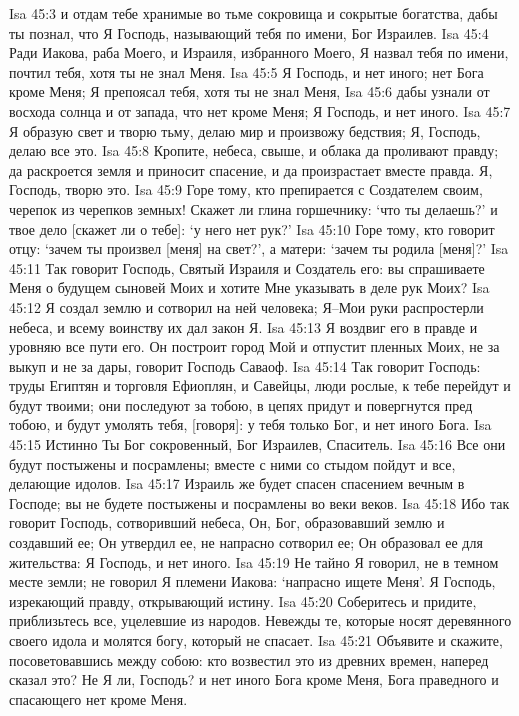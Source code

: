 Isa 45:3  и отдам тебе хранимые во тьме сокровища и сокрытые богатства, дабы ты познал, что Я Господь, называющий тебя по имени, Бог Израилев.
Isa 45:4  Ради Иакова, раба Моего, и Израиля, избранного Моего, Я назвал тебя по имени, почтил тебя, хотя ты не знал Меня.
Isa 45:5  Я Господь, и нет иного; нет Бога кроме Меня; Я препоясал тебя, хотя ты не знал Меня,
Isa 45:6  дабы узнали от восхода солнца и от запада, что нет кроме Меня; Я Господь, и нет иного.
Isa 45:7  Я образую свет и творю тьму, делаю мир и произвожу бедствия; Я, Господь, делаю все это.
Isa 45:8  Кропите, небеса, свыше, и облака да проливают правду; да раскроется земля и приносит спасение, и да произрастает вместе правда. Я, Господь, творю это.
Isa 45:9  Горе тому, кто препирается с Создателем своим, черепок из черепков земных! Скажет ли глина горшечнику: `что ты делаешь?' и твое дело [скажет ли о тебе]: `у него нет рук?'
Isa 45:10  Горе тому, кто говорит отцу: `зачем ты произвел [меня] на свет?', а матери: `зачем ты родила [меня]?'
Isa 45:11  Так говорит Господь, Святый Израиля и Создатель его: вы спрашиваете Меня о будущем сыновей Моих и хотите Мне указывать в деле рук Моих?
Isa 45:12  Я создал землю и сотворил на ней человека; Я--Мои руки распростерли небеса, и всему воинству их дал закон Я.
Isa 45:13  Я воздвиг его в правде и уровняю все пути его. Он построит город Мой и отпустит пленных Моих, не за выкуп и не за дары, говорит Господь Саваоф.
Isa 45:14  Так говорит Господь: труды Египтян и торговля Ефиоплян, и Савейцы, люди рослые, к тебе перейдут и будут твоими; они последуют за тобою, в цепях придут и повергнутся пред тобою, и будут умолять тебя, [говоря]: у тебя только Бог, и нет иного Бога.
Isa 45:15  Истинно Ты Бог сокровенный, Бог Израилев, Спаситель.
Isa 45:16  Все они будут постыжены и посрамлены; вместе с ними со стыдом пойдут и все, делающие идолов.
Isa 45:17  Израиль же будет спасен спасением вечным в Господе; вы не будете постыжены и посрамлены во веки веков.
Isa 45:18  Ибо так говорит Господь, сотворивший небеса, Он, Бог, образовавший землю и создавший ее; Он утвердил ее, не напрасно сотворил ее; Он образовал ее для жительства: Я Господь, и нет иного.
Isa 45:19  Не тайно Я говорил, не в темном месте земли; не говорил Я племени Иакова: `напрасно ищете Меня'. Я Господь, изрекающий правду, открывающий истину.
Isa 45:20  Соберитесь и придите, приблизьтесь все, уцелевшие из народов. Невежды те, которые носят деревянного своего идола и молятся богу, который не спасает.
Isa 45:21  Объявите и скажите, посоветовавшись между собою: кто возвестил это из древних времен, наперед сказал это? Не Я ли, Господь? и нет иного Бога кроме Меня, Бога праведного и спасающего нет кроме Меня.
